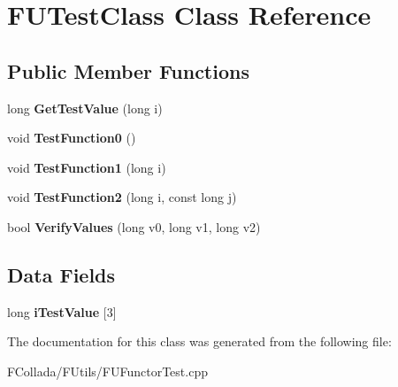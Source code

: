 \hypertarget{classFUTestClass}{
\section{FUTestClass Class Reference}
\label{classFUTestClass}
}
\subsection*{Public Member Functions}
\begin{DoxyCompactItemize}
\item 
\hypertarget{classFUTestClass_a8782cc7d6fdd0481b7632d64c572fd43}{
long {\bfseries GetTestValue} (long i)}
\label{classFUTestClass_a8782cc7d6fdd0481b7632d64c572fd43}

\item 
\hypertarget{classFUTestClass_a692e66e2e6506d817fe8b7324c623ecf}{
void {\bfseries TestFunction0} ()}
\label{classFUTestClass_a692e66e2e6506d817fe8b7324c623ecf}

\item 
\hypertarget{classFUTestClass_a3cea0b18c141e64f1c865194341fa0e2}{
void {\bfseries TestFunction1} (long i)}
\label{classFUTestClass_a3cea0b18c141e64f1c865194341fa0e2}

\item 
\hypertarget{classFUTestClass_adc73bc680f9bd7407ea4a06febde9992}{
void {\bfseries TestFunction2} (long i, const long j)}
\label{classFUTestClass_adc73bc680f9bd7407ea4a06febde9992}

\item 
\hypertarget{classFUTestClass_a68de0be64e8ded9ac2779a5181b0467e}{
bool {\bfseries VerifyValues} (long v0, long v1, long v2)}
\label{classFUTestClass_a68de0be64e8ded9ac2779a5181b0467e}

\end{DoxyCompactItemize}
\subsection*{Data Fields}
\begin{DoxyCompactItemize}
\item 
\hypertarget{classFUTestClass_a2b41d6a0b4fec2ed2049b9c21231a5ac}{
long {\bfseries iTestValue} \mbox{[}3\mbox{]}}
\label{classFUTestClass_a2b41d6a0b4fec2ed2049b9c21231a5ac}

\end{DoxyCompactItemize}


The documentation for this class was generated from the following file:\begin{DoxyCompactItemize}
\item 
FCollada/FUtils/FUFunctorTest.cpp\end{DoxyCompactItemize}
